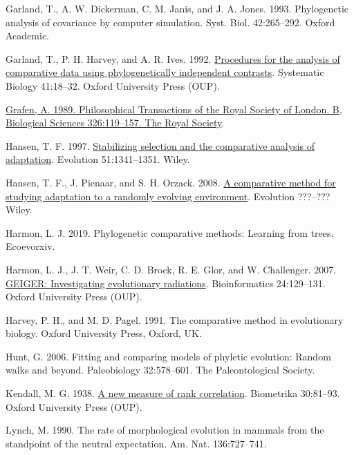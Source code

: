 \documentclass[fleqn,10pt,lineno]{wlpeerj} %
\newlength{\cslhangindent}
\newenvironment{CSLReferences}[2] %
 {\begin{list}{}{%
  \setlength{\itemindent}{0pt}
  \setlength{\leftmargin}{0pt}
  \setlength{\parsep}{0pt}
  \ifodd #1
   \setlength{\leftmargin}{\cslhangindent}
   \setlength{\itemindent}{-1\cslhangindent}
  \fi
  \setlength{\itemsep}{#2\baselineskip}}}
 {\end{list}}
\begin{document}
\begin{CSLReferences}{1}{0}
Garland, T., A. W. Dickerman, C. M. Janis, and J. A. Jones. 1993. Phylogenetic analysis of covariance by computer simulation. Syst. Biol. 42:265--292. Oxford Academic.

Garland, T., P. H. Harvey, and A. R. Ives. 1992. \href{https://doi.org/10.1093/sysbio/41.1.18}{Procedures for the analysis of comparative data using phylogenetically independent contrasts}. Systematic Biology 41:18--32. Oxford University Press (OUP).

\href{https://doi.org/10.1098/rstb.1989.0106}{Grafen, A. 1989. Philosophical Transactions of the Royal Society of London. B, Biological Sciences 326:119--157. The Royal Society}.

Hansen, T. F. 1997. \href{https://doi.org/10.1111/j.1558-5646.1997.tb01457.x}{Stabilizing selection and the comparative analysis of adaptation}. Evolution 51:1341--1351. Wiley.

Hansen, T. F., J. Pienaar, and S. H. Orzack. 2008. \href{https://doi.org/10.1111/j.1558-5646.2008.00412.x}{A comparative method for studying adaptation to a randomly evolving environment}. Evolution ???--??? Wiley.

Harmon, L. J. 2019. Phylogenetic comparative methods: Learning from trees. Ecoevorxiv.

Harmon, L. J., J. T. Weir, C. D. Brock, R. E. Glor, and W. Challenger. 2007. \href{https://doi.org/10.1093/bioinformatics/btm538}{GEIGER: Investigating evolutionary radiations}. Bioinformatics 24:129--131. Oxford University Press (OUP).

Harvey, P. H., and M. D. Pagel. 1991. The comparative method in evolutionary biology. Oxford University Press, Oxford, UK.

Hunt, G. 2006. Fitting and comparing models of phyletic evolution: Random walks and beyond. Paleobiology 32:578--601. The Paleontological Society.

Kendall, M. G. 1938. \href{https://doi.org/10.1093/biomet/30.1-2.81}{A new measure of rank correlation}. Biometrika 30:81--93. Oxford University Press (OUP).

Lynch, M. 1990. The rate of morphological evolution in mammals from the standpoint of the neutral expectation. Am. Nat. 136:727--741.


\end{CSLReferences}
\end{document}
